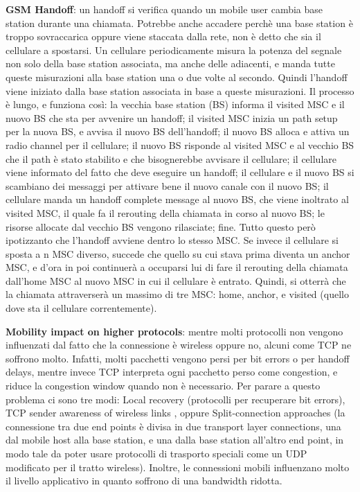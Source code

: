 \documentclass[a4paper,10pt]{article} %
\renewcommand{\b}[1]{%
    {\textbf{#1}}}
\begin{document}
\b{GSM Handoff}: un handoff si verifica quando un mobile user cambia base station durante una chiamata. Potrebbe anche accadere perchè una base station è troppo sovraccarica oppure viene staccata dalla rete, non è detto che sia il cellulare a spostarsi. Un cellulare periodicamente misura la potenza del segnale non solo della base station associata, ma anche delle adiacenti, e manda tutte queste misurazioni alla base station una o due volte al secondo. Quindi l'handoff viene iniziato dalla base station associata in base a queste misurazioni. Il processo è lungo, e funziona così: la vecchia base station (BS) informa il visited MSC e il nuovo BS che sta per avvenire un handoff; il visited MSC inizia un path setup per la nuova BS, e avvisa il nuovo BS dell'handoff; il nuovo BS alloca e attiva un radio channel per il cellulare; il nuovo BS risponde al visited MSC e al vecchio BS che il path è stato stabilito e che bisognerebbe avvisare il cellulare; il cellulare viene informato del fatto che deve eseguire un handoff; il cellulare e il nuovo BS si scambiano dei messaggi per attivare bene il nuovo canale con il nuovo BS; il cellulare manda un handoff complete message al nuovo BS, che viene inoltrato al visited MSC, il quale fa il rerouting della chiamata in corso al nuovo BS; le risorse allocate dal vecchio BS vengono rilasciate; fine. Tutto questo però ipotizzanto che l'handoff avviene dentro lo stesso MSC. Se invece il cellulare si sposta a n MSC diverso, succede che quello su cui stava prima diventa un anchor MSC, e d'ora in poi continuerà a occuparsi lui di fare il rerouting della chiamata dall'home MSC al nuovo MSC in cui il cellulare è entrato. Quindi, si otterrà che la chiamata attraverserà un massimo di tre MSC: home, anchor, e visited (quello dove sta il cellulare correntemente).

\b{Mobility impact on higher protocols}: mentre molti protocolli non vengono influenzati dal fatto che la connessione è wireless oppure no, alcuni come TCP ne soffrono molto. Infatti, molti pacchetti vengono persi per bit errors o per handoff delays, mentre invece TCP interpreta ogni pacchetto perso come congestion, e riduce la congestion window quando non è necessario. Per parare a questo problema ci sono tre modi: Local recovery (protocolli per recuperare bit errors), TCP sender awareness of wireless links , oppure Split-connection approaches (la connessione tra due end points è divisa in due transport layer connections, una dal mobile host alla base station, e una dalla base station all'altro end point, in modo tale da poter usare protocolli di trasporto speciali come un UDP modificato per il tratto wireless). Inoltre, le connessioni mobili influenzano molto il livello applicativo in quanto soffrono di una bandwidth ridotta.
\end{document}
